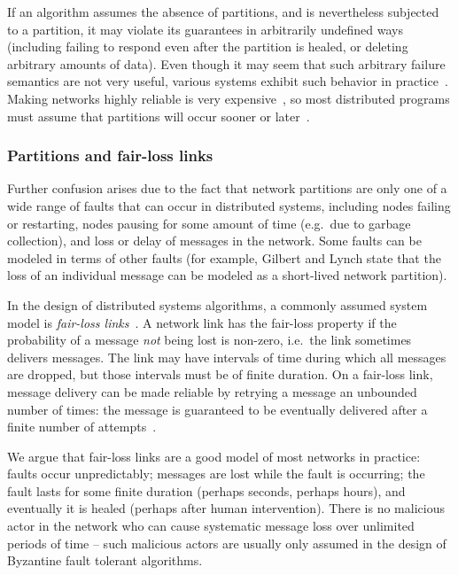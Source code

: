 \documentclass[a4paper,twocolumn,10pt]{article}
\begin{document}
If an algorithm assumes the absence of partitions, and is nevertheless subjected to a partition, it
may violate its guarantees in arbitrarily undefined ways (including failing to respond even after
the partition is healed, or deleting arbitrary amounts of data). Even though it may seem that such
arbitrary failure semantics are not very useful, various systems exhibit such behavior in
practice~\cite{Kingsbury2014tk, Kingsbury2015uk}. Making networks highly reliable is very
expensive~\cite{Bailis2014jx}, so most distributed programs must assume that partitions will occur
sooner or later~\cite{Hale2010we}.

\subsubsection{Partitions and fair-loss links}\label{sec:fairloss}

Further confusion arises due to the fact that network partitions are only one of a wide range of
faults that can occur in distributed systems, including nodes failing or restarting, nodes pausing
for some amount of time (e.g.\ due to garbage collection), and loss or delay of messages in the
network. Some faults can be modeled in terms of other faults (for example, Gilbert and Lynch state
that the loss of an individual message can be modeled as a short-lived network partition).

In the design of distributed systems algorithms, a commonly assumed system model is \emph{fair-loss
links}~\cite{Cachin2011wt}. A network link has the fair-loss property if the probability of a
message \emph{not} being lost is non-zero, i.e.\ the link sometimes delivers messages. The link may
have intervals of time during which all messages are dropped, but those intervals must be of finite
duration. On a fair-loss link, message delivery can be made reliable by retrying a message an
unbounded number of times: the message is guaranteed to be eventually delivered after a finite
number of attempts~\cite{Cachin2011wt}.

We argue that fair-loss links are a good model of most networks in practice: faults occur
unpredictably; messages are lost while the fault is occurring; the fault lasts for some finite
duration (perhaps seconds, perhaps hours), and eventually it is healed (perhaps after human
intervention). There is no malicious actor in the network who can cause systematic message loss over
unlimited periods of time -- such malicious actors are usually only assumed in the design of
Byzantine fault tolerant algorithms.
\end{document}
